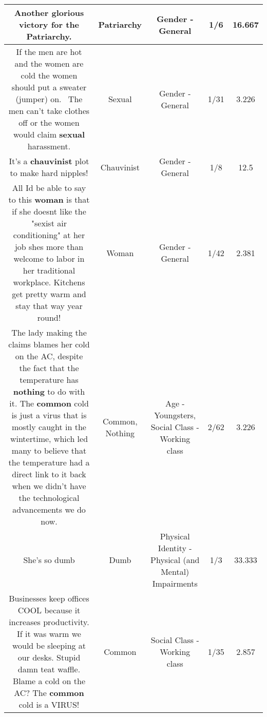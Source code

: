 \documentclass[11pt]{article}
\newlength\mylength
\begin{document}
\begin{center}
\begin{longtable}{|C{.65\mylength}|C{.30\mylength}|C{.12\mylength}|C{.12\mylength}|C{.12\mylength}|}
  \small Another glorious victory for the \textbf{Patriarchy}.\normalsize   & Patriarchy & Gender - General & 1/6 & 16.667 \\  \hline
  \small If the men are hot and the women are cold the women should put a sweater (jumper) on.  The men can't take clothes off or the women would claim \textbf{sexual} harassment.\normalsize   & Sexual & Gender - General & 1/31 & 3.226 \\  \hline
  \small It's a \textbf{chauvinist} plot to make hard nipples!\normalsize   & Chauvinist & Gender - General & 1/8 & 12.5 \\  \hline
  \small All Id be able to say to this \textbf{woman} is that if she doesnt like the "sexist air conditioning" at her job shes more than welcome to labor in her traditional workplace. Kitchens get pretty warm and stay that way year round!\normalsize   & Woman & Gender - General & 1/42 & 2.381 \\  \hline
  \small The lady making the claims blames her cold on the AC, despite the fact that the temperature has \textbf{nothing} to do with it. The \textbf{common} cold is just a virus that is mostly caught in the wintertime, which led many to believe that the temperature had a direct link to it back when we didn't have the technological advancements we do now.\normalsize   & Common, Nothing & Age - Youngsters, Social Class - Working class & 2/62 & 3.226 \\  \hline
  \small She's so dumb\normalsize   & Dumb & Physical Identity - Physical (and Mental) Impairments & 1/3 & 33.333 \\  \hline
  \small Businesses keep offices COOL because it increases productivity. If it was warm we would be sleeping at our desks. Stupid damn teat waffle. Blame a cold on the AC? The \textbf{common} cold is a VIRUS!\normalsize   & Common & Social Class - Working class & 1/35 & 2.857 \\  \hline

\end{longtable}
\end{center}
\end{document}
